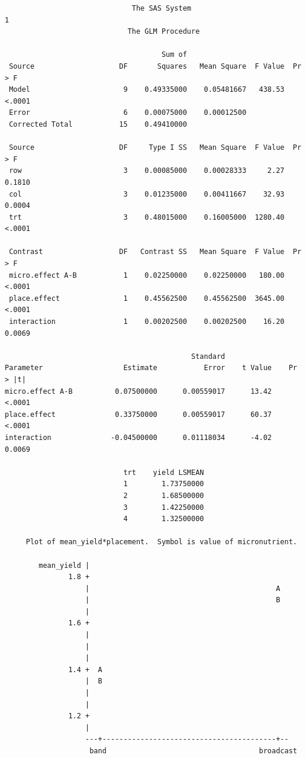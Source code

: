 \begin{small}
\begin{verbatim}
                              The SAS System                              1
                             The GLM Procedure

                                     Sum of
 Source                    DF       Squares   Mean Square  F Value  Pr > F
 Model                      9    0.49335000    0.05481667   438.53  <.0001
 Error                      6    0.00075000    0.00012500                 
 Corrected Total           15    0.49410000                               

 Source                    DF     Type I SS   Mean Square  F Value  Pr > F
 row                        3    0.00085000    0.00028333     2.27  0.1810
 col                        3    0.01235000    0.00411667    32.93  0.0004
 trt                        3    0.48015000    0.16005000  1280.40  <.0001

 Contrast                  DF   Contrast SS   Mean Square  F Value  Pr > F
 micro.effect A-B           1    0.02250000    0.02250000   180.00  <.0001
 place.effect               1    0.45562500    0.45562500  3645.00  <.0001
 interaction                1    0.00202500    0.00202500    16.20  0.0069

                                            Standard
Parameter                   Estimate           Error    t Value    Pr > |t|
micro.effect A-B          0.07500000      0.00559017      13.42      <.0001
place.effect              0.33750000      0.00559017      60.37      <.0001
interaction              -0.04500000      0.01118034      -4.02      0.0069

                            trt    yield LSMEAN
                            1        1.73750000
                            2        1.68500000
                            3        1.42250000
                            4        1.32500000

     Plot of mean_yield*placement.  Symbol is value of micronutrient.

        mean_yield |
               1.8 +
                   |                                            A
                   |                                            B
                   |
               1.6 +
                   |
                   |
                   |
               1.4 +  A
                   |  B
                   |
                   |
               1.2 +
                   |
                   ---+-----------------------------------------+--
                    band                                    broadcast
\end{verbatim}
\end{small}
